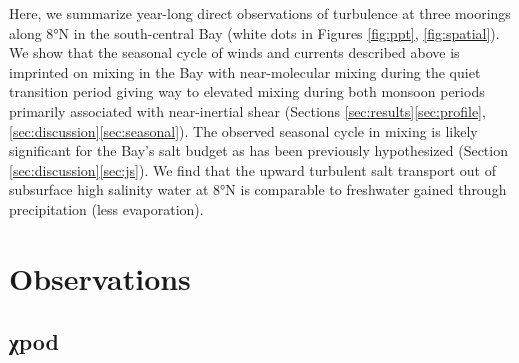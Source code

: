 \documentclass[onecol]{ametsoc}
\begin{document}
Here, we summarize year-long direct observations of turbulence at three moorings along 8°N in the south-central Bay (white dots in Figures \ref{fig:ppt}, \ref{fig:spatial}). We show that the seasonal cycle of winds and currents described above is imprinted on mixing in the Bay with near-molecular mixing during the quiet transition period giving way to elevated mixing during both monsoon periods primarily associated with near-inertial shear (Sections \ref{sec:results}\ref{sec:profile}, \ref{sec:discussion}\ref{sec:seasonal}). The observed seasonal cycle in mixing is likely significant for the Bay's salt budget as has been previously hypothesized (Section \ref{sec:discussion}\ref{sec:js}). We find that the upward turbulent salt transport out of subsurface high salinity water at 8°N is comparable to freshwater gained through precipitation (less evaporation).


\section{Observations}
\label{sec:org8690ffb}
\label{sec:obs}

\subsection{χpod}
\label{sec:org94fefd7}
\label{sec:pod}
\end{document}

